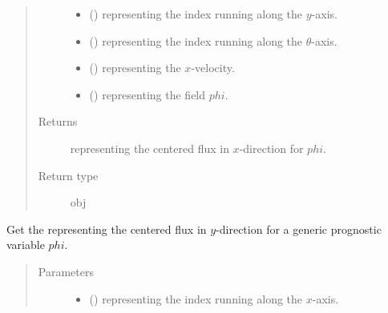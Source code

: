 \documentclass[letterpaper,10pt,english]{sphinxmanual}
\begin{document}
\begin{fulllineitems}
\begin{fulllineitems}
\begin{quote}
\begin{description}
\begin{itemize}
\item {} 
 () \textendash{}  representing the index running along the \(y\)-axis.

\item {} 
 () \textendash{}  representing the index running along the \(\theta\)-axis.

\item {} 
 () \textendash{}  representing the \(x\)-velocity.

\item {} 
 () \textendash{}  representing the field \(phi\).

\end{itemize}

\item[{Returns}] \leavevmode
{} representing the centered flux in \(x\)-direction for \(phi\).

\item[{Return type}] \leavevmode
obj

\end{description}\end{quote}

\end{fulllineitems}


\begin{fulllineitems}
\label{\detokenize{api:dycore.flux_isentropic_centered.FluxIsentropicCentered._get_centered_flux_y}}
Get the  representing the centered flux in \(y\)-direction
for a generic prognostic variable \(phi\).
\begin{quote}\begin{description}
\item[{Parameters}] \leavevmode\begin{itemize}
\item {} 
 () \textendash{}  representing the index running along the \(x\)-axis.


\end{itemize}
\end{description}
\end{quote}
\end{fulllineitems}
\end{fulllineitems}
\end{document}
